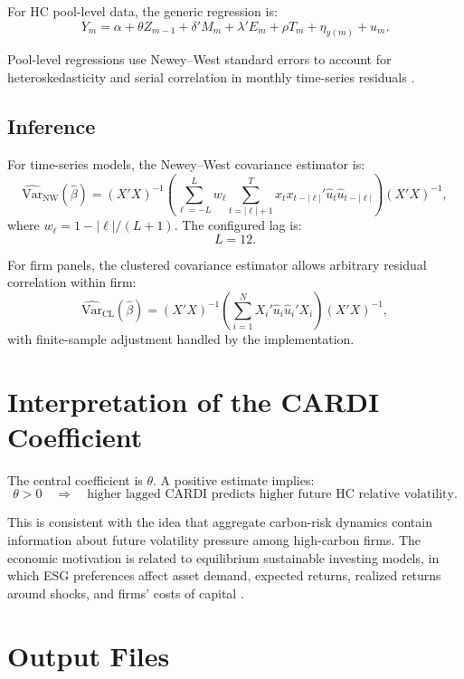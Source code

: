 \documentclass[11pt]{article}
\begin{document}
For HC pool-level data, the generic regression is:
\begin{equation}
Y_{m}
=
\alpha
+ \theta Z_{m-1}
+ \delta' M_m
+ \lambda' E_m
+ \rho T_m
+ \eta_{y(m)}
+ u_m.
\end{equation}

Pool-level regressions use Newey--West standard errors to account for
heteroskedasticity and serial correlation in monthly time-series residuals
\citep{neweywest1987}.

\subsection{Inference}

For time-series models, the Newey--West covariance estimator is:
\begin{equation}
\widehat{\mathrm{Var}}_{\mathrm{NW}}(\hat{\beta})
=
(X'X)^{-1}
\left(
\sum_{\ell=-L}^{L} w_\ell
\sum_{t=|\ell|+1}^{T}
x_t x_{t-|\ell|}'\hat{u}_t\hat{u}_{t-|\ell|}
\right)
(X'X)^{-1},
\end{equation}
where \(w_\ell = 1 - |\ell|/(L+1)\). The configured lag is:
\[
L = 12.
\]

For firm panels, the clustered covariance estimator allows arbitrary residual
correlation within firm:
\begin{equation}
\widehat{\mathrm{Var}}_{\mathrm{CL}}(\hat{\beta})
=
(X'X)^{-1}
\left(
\sum_{i=1}^{N} X_i'\hat{u}_i\hat{u}_i'X_i
\right)
(X'X)^{-1},
\end{equation}
with finite-sample adjustment handled by the implementation.

\section{Interpretation of the CARDI Coefficient}

The central coefficient is \(\theta\). A positive estimate implies:
\[
\theta > 0
\quad \Rightarrow \quad
\text{higher lagged CARDI predicts higher future HC relative volatility}.
\]

This is consistent with the idea that aggregate carbon-risk dynamics contain
information about future volatility pressure among high-carbon firms. The
economic motivation is related to equilibrium sustainable investing models, in
which ESG preferences affect asset demand, expected returns, realized returns
around shocks, and firms' costs of capital \citep{pastor2021}.

\section{Output Files}
\end{document}
